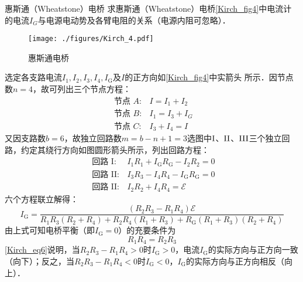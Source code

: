 \begin{example}{惠斯通（Wheatstone）电桥}
求惠斯通（Wheatstone）电桥\autoref{Kirch_fig4}中电流计的电流$I_G$与电源电动势及各臂电阻的关系（电源内阻可忽略）．
\begin{figure}[ht]
\centering
\texttt{[image: ./figures/Kirch\_4.pdf]}
\caption{惠斯通电桥} \label{Kirch_fig4}
\end{figure}

选定各支路电流$I_{1}, I_{2}, I_{3}, I_{4}, I_{\mathrm{G}}$及$I $的正方向如\autoref{Kirch_fig4}中实箭头
所示．因节点数$n = 4$，故可列出三个节点方程：
\begin{equation}
\begin{array}{ll}\text { 节点 } A: & I=I_{1}+I_{2} \\ \text { 节点 } B: & I_{1}=I_{3}+I_{G} \\ \text { 节点 } C: & I_{3}+I_{4}=I\end{array}
\end{equation}
又因支路数$b=6$，故独立回路数$m=b-n+1=3$选图中$\rm I$、$\rm II$、$\rm III$三个独立回路，约定其绕行方向如图圆形箭头所示，列出回路方程：
\begin{equation}
\begin{array}{ll}\text { 回路 } \mathrm{I}: & I_{1} R_{1}+I_{\mathrm{G}} R_{\mathrm{G}}-I_{2} R_{2}=0 \\ \text { 回路 } \mathrm{II}: & I_{3} R_{3}-I_{4} R_{4}-I_{\mathrm{G}} R_{\mathrm{G}}=0 \\ \text { 回路 } \mathrm{II}  : & I_{2} R_{2}+I_{4} R_{4}=\mathscr{E}\end{array}
\end{equation}
六个方程联立解得：
\begin{equation} \label{Kirch_eq6}
I_{\mathrm{G}}=\frac{\left(R_{2} R_{3}-R_{1} R_{4}\right) \mathscr{E}}{{R}_{1} R_{3}\left(R_{2}+R_{4}\right)+R_{2} R_{4}\left(R_{1}+R_{3}\right)+R_{\mathrm{G}}\left(R_{1}+R_{3}\right)\left(R_{2}+R_{4}\right)}
\end{equation}
由上式可知电桥平衡（即$I_\mathrm{G} = 0$）的充要条件为
\begin{equation}
R_{1} R_{4}=R_{2} R_{3}
\end{equation}
\autoref{Kirch_eq6}说明，当$R_{2} R_{3}-R_{1} R_{4}>0$时$I_{\mathrm{G}}>0$，电流$I_{\mathrm{G}}$的实际方向与正方向一致（向下）；反之，当$R_{2} R_{3}-R_{1} R_{4}<0$时$I_{\mathrm{G}}<0$，$I_{\mathrm{G}}$的实际方向与正方向相反（向上）．
\end{example}
